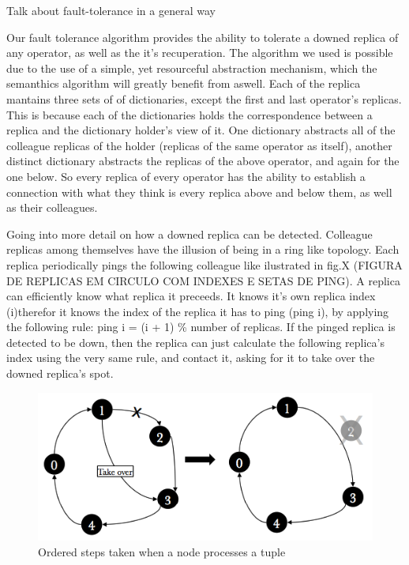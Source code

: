 \documentclass[times, 10pt,twocolumn]{article}
\begin{document}
Talk about fault-tolerance in a general way

Our fault tolerance algorithm provides the ability to tolerate a downed replica of any operator, as well as the it's recuperation.
The algorithm we used is possible due to the use of a simple, yet resourceful abstraction mechanism, which the semanthics algorithm will greatly benefit from aswell.
Each of the replica mantains three sets of of dictionaries, except the first and last operator's replicas. This is because each of the dictionaries holds the correspondence between a replica and the dictionary holder's view of it.
One dictionary abstracts all of the colleague replicas of the holder (replicas of the same operator as itself), another distinct dictionary abstracts the replicas of the above operator, and again for the one below.
So every replica of every operator has the ability to establish a connection with what they think is every replica above and below them, as well as their colleagues.


Going into more detail on how a downed replica can be detected.
Colleague replicas among themselves have the illusion of being in a ring like topology. Each replica periodically pings the following colleague like ilustrated in fig.X (FIGURA DE REPLICAS EM CIRCULO COM INDEXES E SETAS DE PING). A replica can efficiently know what replica it preceeds. It knows it's own replica index (i)therefor it knows the index of the replica it has to ping (ping i), by applying the following rule: ping i = (i + 1) \% number of replicas.
If the pinged replica is detected to be down, then the replica can just calculate the following replica's index using the very same rule, and contact it, asking for it to take over the downed replica's spot.
\begin{figure}[h] 
	\includegraphics[width=\columnwidth]{fault_detection}
	\caption{Ordered steps taken when a node processes a tuple}
\end{figure}
\end{document}

